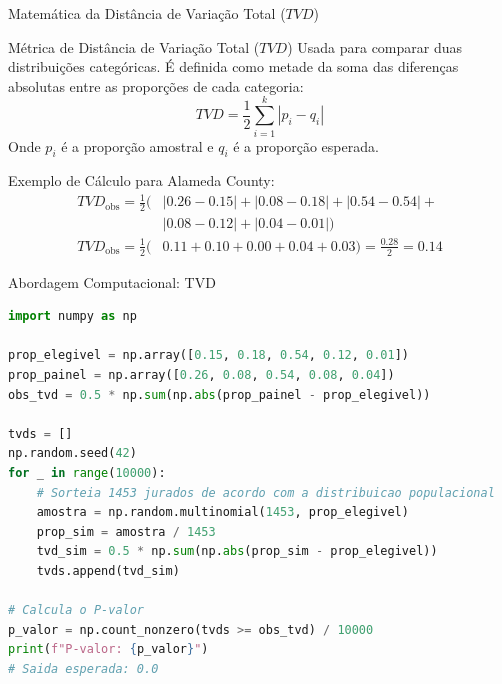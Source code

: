 \begin{frame}{Matemática da Distância de Variação Total ($TVD$)}
    \begin{block}{Métrica de Distância de Variação Total ($TVD$)}
        Usada para comparar duas distribuições categóricas. É definida como metade da soma das diferenças absolutas entre as proporções de cada categoria:
        $$TVD = \frac{1}{2} \sum_{i=1}^{k} |p_i - q_i|$$
        Onde $p_i$ é a proporção amostral e $q_i$ é a proporção esperada.
    \end{block}
    \begin{block}{Exemplo de Cálculo para Alameda County:}
        {\small
        \begin{align*}
        TVD_{\text{obs}} = \frac{1}{2} \Big( &|0.26-0.15| + |0.08-0.18| + |0.54-0.54| + {} \\
        &|0.08-0.12| + |0.04-0.01| \Big) \\[1ex]
        TVD_{\text{obs}} = \frac{1}{2} \big( &0.11 + 0.10 + 0.00 + 0.04 + 0.03 \big) = \frac{0.28}{2} = 0.14
        \end{align*}
        }
    \end{block}
\end{frame}

\begin{frame}[fragile]{Abordagem Computacional: TVD}
\begin{lstlisting}[language=Python]
import numpy as np

prop_elegivel = np.array([0.15, 0.18, 0.54, 0.12, 0.01])
prop_painel = np.array([0.26, 0.08, 0.54, 0.08, 0.04])
obs_tvd = 0.5 * np.sum(np.abs(prop_painel - prop_elegivel))

tvds = []
np.random.seed(42)
for _ in range(10000):
    # Sorteia 1453 jurados de acordo com a distribuicao populacional
    amostra = np.random.multinomial(1453, prop_elegivel)
    prop_sim = amostra / 1453
    tvd_sim = 0.5 * np.sum(np.abs(prop_sim - prop_elegivel))
    tvds.append(tvd_sim)

# Calcula o P-valor
p_valor = np.count_nonzero(tvds >= obs_tvd) / 10000
print(f"P-valor: {p_valor}")
# Saida esperada: 0.0
\end{lstlisting}
\end{frame}

